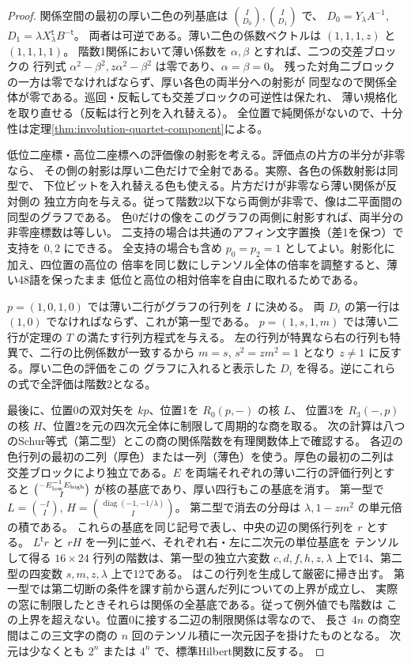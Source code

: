\begin{proof}
関係空間の最初の厚い二色の列基底は $\binom{I}{D_0},\binom{I}{D_1}$ で、
$D_0=Y_\lambda A^{-1}$, $D_1=\lambda X_\lambda^{\mathsf t}B^{-\mathsf t}$。
両者は可逆である。薄い二色の係数ベクトルは $(1,1,1,z)$ と $(1,1,1,1)$。
階数1関係において薄い係数を $\alpha,\beta$ とすれば、二つの交差ブロックの
行列式 $\alpha^2-\beta^2,z\alpha^2-\beta^2$ は零であり、$\alpha=\beta=0$。
残った対角二ブロックの一方は零でなければならず、厚い各色の両半分への射影が
同型なので関係全体が零である。巡回・反転しても交差ブロックの可逆性は保たれ、
薄い規格化を取り直せる（反転は行と列を入れ替える）。
全位置で純関係がないので、十分性は定理\ref{thm:involution-quartet-component}による。

低位二座標・高位二座標への評価像の射影を考える。評価点の片方の半分が非零なら、
その側の射影は厚い二色だけで全射である。実際、各色の係数射影は同型で、
下位ビットを入れ替える色も使える。片方だけが非零なら薄い関係が反対側の
独立方向を与える。従って階数2以下なら両側が非零で、像は二平面間の同型のグラフである。
色0だけの像をこのグラフの両側に射影すれば、両半分の非零座標数は等しい。
二支持の場合は共通のアフィン文字置換（差1を保つ）で支持を $0,2$ にできる。
全支持の場合も含め $p_0=p_2=1$ としてよい。射影化に加え、四位置の高位の
倍率を同じ数にしテンソル全体の倍率を調整すると、薄い48語を保ったまま
低位と高位の相対倍率を自由に取れるためである。

$p=(1,0,1,0)$ では薄い二行がグラフの行列を $I$ に決める。
両 $D_i$ の第一行は $(1,0)$ でなければならず、これが第一型である。
$p=(1,s,1,m)$ では薄い二行が定理の $T$ の満たす行列方程式を与える。
左の行列が特異なら右の行列も特異で、二行の比例係数が一致するから
$m=s$, $s^2=zm^2=1$ となり $z\ne1$ に反する。厚い二色の評価をこの
グラフに入れると表示した $D_i$ を得る。逆にこれらの式で全評価は階数2となる。

最後に、位置0の双対矢を $kp$、位置1を $R_0(p,-)$ の核 $L$、
位置3を $R_3(-,p)$ の核 $H$、位置2を元の四次元全体に制限して周期的な商を取る。
次の計算は八つのSchur等式（第二型）とこの商の関係階数を有理関数体上で確認する。
各辺の色行列の最初の二列（厚色）または一列（薄色）を使う。厚色の最初の二列は
交差ブロックにより独立である。$E$ を両端それぞれの薄い二行の評価行列とすると
$\binom{-E_{\rm low}^{-1}E_{\rm high}}{I}$ が核の基底であり、厚い四行もこの基底を消す。
第一型で $L=\binom{-I}{I}$, $H=\binom{\operatorname{diag}(-1,-1/\lambda)}{I}$。
第二型で消去の分母は $\lambda,1-zm^2$ の単元倍の積である。
これらの基底を同じ記号で表し、中央の辺の関係行列を $r$ とする。
$L^{\mathsf t}r$ と $rH$ を一列に並べ、それぞれ右・左に二次元の単位基底を
テンソルして得る $16\times24$ 行列の階数は、第一型の独立六変数
$c,d,f,h,z,\lambda$ 上で14、第二型の四変数 $s,m,z,\lambda$ 上で12である。
 はこの行列を生成して厳密に掃き出す。
第一型では第二切断の条件を課す前から選んだ列についての上界が成立し、
実際の窓に制限したときそれらは関係の全基底である。従って例外値でも階数は
この上界を超えない。位置0に接する二辺の制限関係は零なので、
長さ $4n$ の商空間はこの三文字の商の $n$ 回のテンソル積に一次元因子を掛けたものとなる。
次元は少なくとも $2^n$ または $4^n$ で、標準Hilbert関数に反する。
\end{proof}
